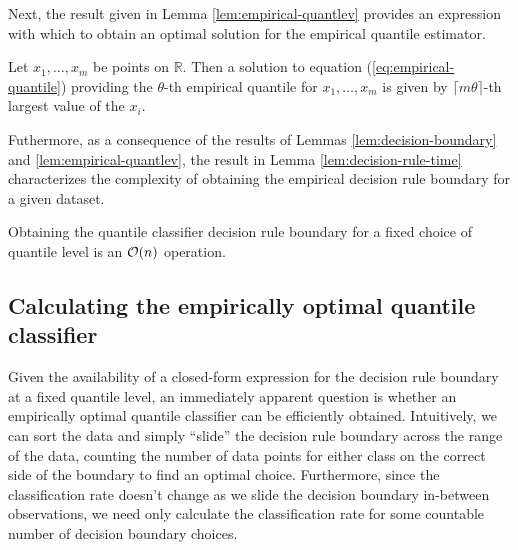 Next, the result given in Lemma \ref{lem:empirical-quantlev} provides an
expression with which to obtain an optimal solution for the empirical quantile
estimator.  

\begin{lemma}
  \label{lem:empirical-quantlev}
  Let $x_1, \dots, x_m$ be points on $\mathbb{R}$.  Then a solution to equation
  (\ref{eq:empirical-quantile}) providing the $\theta$-th empirical quantile for
  $x_1, \dots, x_m$ is given by $\lceil m \theta \rceil$-th largest value of the
  $x_i$.
\end{lemma}

Futhermore, as a consequence of the results of Lemmas
\ref{lem:decision-boundary} and \ref{lem:empirical-quantlev}, the result in
Lemma \ref{lem:decision-rule-time} characterizes the complexity of obtaining the
empirical decision rule boundary for a given dataset.

\begin{lemma}
  \label{lem:decision-rule-time}
  Obtaining the quantile classifier decision rule boundary for a fixed choice of
  quantile level is an $\mathcal{O}(n)$ operation.
\end{lemma}




\subsection{Calculating the empirically optimal quantile classifier}
\label{sec:empirically-optimal-algo}

Given the availability of a closed-form expression for the decision rule
boundary at a fixed quantile level, an immediately apparent question is whether
an empirically optimal quantile classifier can be efficiently obtained.
Intuitively, we can sort the data and simply ``slide'' the decision rule
boundary across the range of the data, counting the number of data points for
either class on the correct side of the boundary to find an optimal choice.
Furthermore, since the classification rate doesn't change as we slide the
decision boundary in-between observations, we need only calculate the
classification rate for some countable number of decision boundary choices.


